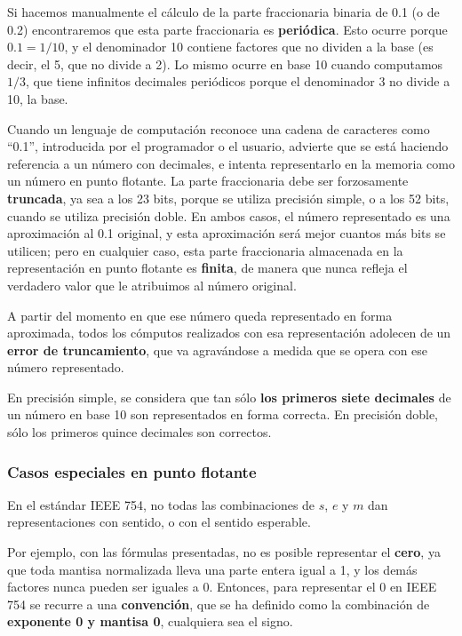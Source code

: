 \documentclass[spanish,A4,]{article}
\begin{document}
Si hacemos manualmente el cálculo de la parte fraccionaria binaria de
0.1 (o de 0.2) encontraremos que esta parte fraccionaria es
\textbf{periódica}. Esto ocurre porque $0.1 = 1/10$, y el denominador 10
contiene factores que no dividen a la base (es decir, el 5, que no
divide a 2). Lo mismo ocurre en base 10 cuando computamos $1/3$, que
tiene infinitos decimales periódicos porque el denominador 3 no divide a
10, la base.

Cuando un lenguaje de computación reconoce una cadena de caracteres como
``0.1'', introducida por el programador o el usuario, advierte que se
está haciendo referencia a un número con decimales, e intenta
representarlo en la memoria como un número en punto flotante. La parte
fraccionaria debe ser forzosamente \textbf{truncada}, ya sea a los 23
bits, porque se utiliza precisión simple, o a los 52 bits, cuando se
utiliza precisión doble. En ambos casos, el número representado es una
aproximación al 0.1 original, y esta aproximación será mejor cuantos más
bits se utilicen; pero en cualquier caso, esta parte fraccionaria
almacenada en la representación en punto flotante es \textbf{finita}, de
manera que nunca refleja el verdadero valor que le atribuimos al número
original.

A partir del momento en que ese número queda representado en forma
aproximada, todos los cómputos realizados con esa representación
adolecen de un \textbf{error de truncamiento}, que va agravándose a
medida que se opera con ese número representado.

En precisión simple, se considera que tan sólo \textbf{los primeros
siete decimales} de un número en base 10 son representados en forma
correcta. En precisión doble, sólo los primeros quince decimales son
correctos.

\subsubsection{Casos especiales en punto
flotante}\label{casos-especiales-en-punto-flotante}

En el estándar IEEE 754, no todas las combinaciones de $s$, $e$ y $m$
dan representaciones con sentido, o con el sentido esperable.

Por ejemplo, con las fórmulas presentadas, no es posible representar el
\textbf{cero}, ya que toda mantisa normalizada lleva una parte entera
igual a 1, y los demás factores nunca pueden ser iguales a 0. Entonces,
para representar el 0 en IEEE 754 se recurre a una \textbf{convención},
que se ha definido como la combinación de \textbf{exponente 0 y mantisa
0}, cualquiera sea el signo.
\end{document}
